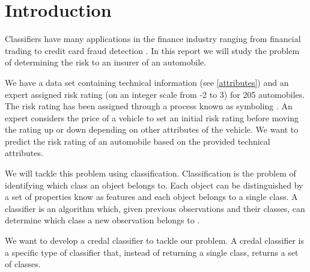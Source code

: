 \chapter{Introduction}


Classifiers have many applications in the finance industry ranging from financial trading \cite{Gerlein16} to credit card fraud detection \cite{Pozzolo15}.
In this report we will study the problem of determining the risk to an insurer of an automobile.

We have a data set containing technical information (see \cref{attributes}) and an expert assigned risk rating (on an integer scale from -2 to 3) for 205 automobiles.
The risk rating has been assigned through a process known as symboling \cite{Automobile}.
An expert considers the price of a vehicle to set an initial risk rating before moving the rating up or down depending on other attributes of the vehicle.
We want to predict the risk rating of an automobile based on the provided technical attributes.

We will tackle this problem using classification.
Classification is the problem of identifying which class an object belongs to.
Each object can be distinguished by a set of properties know as features and each object belongs to a single class.
A classifier is an algorithm which, given previous observations and their classes, can determine which class a new observation belongs to \cite{Theodoridis03}.

We want to develop a credal classifier to tackle our problem.
A credal classifier is a specific type of classifier that, instead of returning a single class, returns a set of classes.

